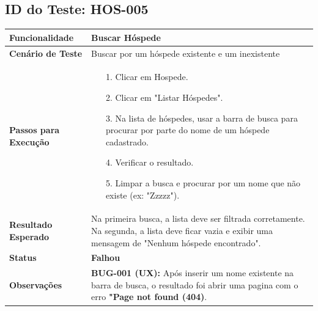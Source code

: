 \documentclass[
	12pt,				%
	openany,			%
	oneside,			%
	a4paper,			%
	english,			%
	french,				%
	spanish,			%
	brazil				%
	]{abntex2}
\begin{document}
\begin{apendicesenv}
	\subsection*{ID do Teste: HOS-005}
	\begin{tabular}{@{} p{5cm} p{11cm} @{}}
		\toprule
		\textbf{Funcionalidade} & Buscar Hóspede \\
		\midrule
		\textbf{Cenário de Teste} & Buscar por um hóspede existente e um inexistente \\
		\midrule
		\textbf{Passos para Execução} &
		\begin{itemize} \itemsep0em 
			\item[1.] Clicar em Hospede.
			\item[2.] Clicar em "Listar Hóspedes".
			\item[3.] Na lista de hóspedes, usar a barra de busca para procurar por parte do nome de um hóspede cadastrado.
			\item[4.] Verificar o resultado.
			\item[5.] Limpar a busca e procurar por um nome que não existe (ex: "Zzzzz").
		\end{itemize} \\
		\midrule
		\textbf{Resultado Esperado} & Na primeira busca, a lista deve ser filtrada corretamente. Na segunda, a lista deve ficar vazia e exibir uma mensagem de "Nenhum hóspede encontrado". \\
		\midrule
		\textbf{Status} & \textbf{Falhou} \\
		\midrule
		\textbf{Observações} &  \textbf{BUG-001 (UX):} Após inserir um nome existente na barra de busca, o resultado foi abrir uma pagina com o erro \textbf{"Page not found (404)}. \\
		\bottomrule
	\end{tabular}
	\vspace{1cm}
	

\end{apendicesenv}
\end{document}
